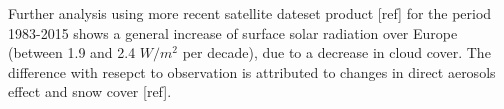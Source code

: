 Further analysis using more recent satellite dateset product [ref] for the period 1983-2015 shows a general increase of surface solar radiation over Europe (between 1.9 and 2.4 $W/m^2$ per decade), due to a decrease in cloud cover. The difference with resepct to observation is attributed to changes in direct aerosols effect and snow cover [ref]. 













